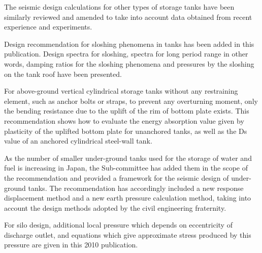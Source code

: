 \documentclass[base=8.8pt,magstyle=real,a4paper,twocolumn,xelatex,pandoc,jafont=ms]{bxjsarticle}
\begin{document}
The seismic design calculations for other types of storage tanks have been similarly reviewed and amended to take into account data obtained from recent experience and experiments.

Design recommendation for sloshing phenomena in tanks has been added in this publication. Design spectra for sloshing, spectra for long period range in other words, damping ratios for the sloshing phenomena and pressures by the sloshing on the tank roof have been presented.

For above-ground vertical cylindrical storage tanks without any restraining element, such as anchor bolts or straps, to prevent any overturning moment, only the bending resistance due to the uplift of the rim of bottom plate exists. This recommendation shows how to evaluate the energy absorption value given by plasticity of the uplifted bottom plate for unanchored tanks, as well as the Ds value of an anchored cylindrical steel-wall tank.

As the number of smaller under-ground tanks used for the storage of water and fuel is increasing in Japan, the Sub-committee has added them in the scope of the recommendation and provided a framework for the seismic design of under-ground tanks. The recommendation has accordingly included a new response displacement method and a new earth pressure calculation method, taking into account the design methods adopted by the civil engineering fraternity.

For silo design, additional local pressure which depends on eccentricity of discharge outlet, and equations which give approximate stress produced by this pressure are given in this 2010 publication.

\par
\egroup
\end{document}
